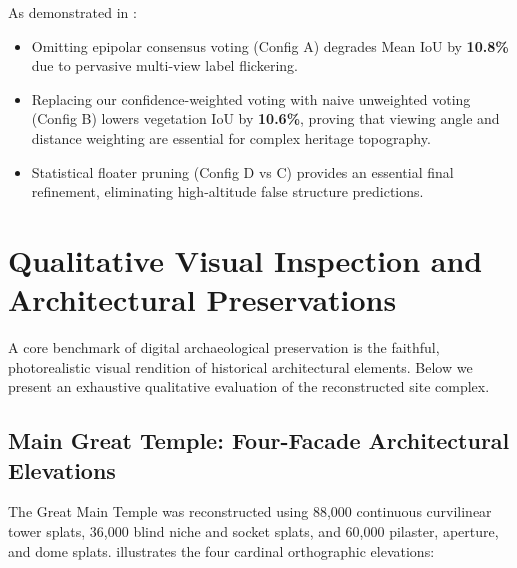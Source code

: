 \documentclass[11pt,a4paper]{article}
\begin{document}
As demonstrated in :
\begin{itemize}
    \item Omitting epipolar consensus voting (Config A) degrades Mean IoU by \textbf{10.8\%} due to pervasive multi-view label flickering.
    \item Replacing our confidence-weighted voting with naive unweighted voting (Config B) lowers vegetation IoU by \textbf{10.6\%}, proving that viewing angle and distance weighting are essential for complex heritage topography.
    \item Statistical floater pruning (Config D vs C) provides an essential final refinement, eliminating high-altitude false structure predictions.
\end{itemize}
\section{Qualitative Visual Inspection and Architectural Preservations}
\label{sec:qualitative_analysis}

A core benchmark of digital archaeological preservation is the faithful, photorealistic visual rendition of historical architectural elements. Below we present an exhaustive qualitative evaluation of the reconstructed site complex.

\subsection{Main Great Temple: Four-Facade Architectural Elevations}
The Great Main Temple was reconstructed using 88,000 continuous curvilinear tower splats, 36,000 blind niche and socket splats, and 60,000 pilaster, aperture, and dome splats.  illustrates the four cardinal orthographic elevations:
\end{document}
